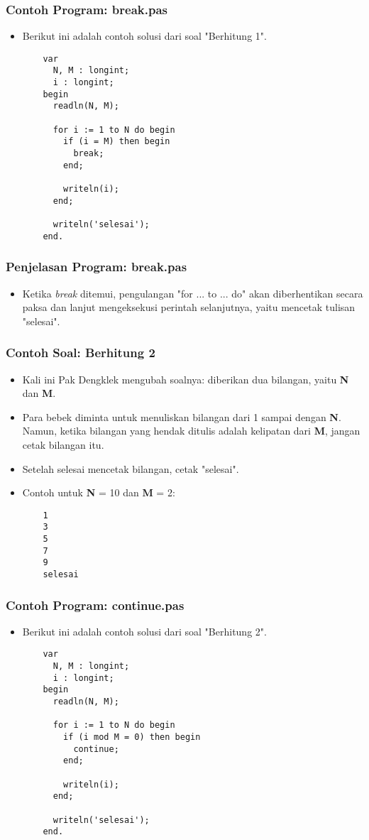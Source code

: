 \begin{frame}[fragile]
\frametitle{Contoh Program: break.pas}
\begin{itemize}
  \item Berikut ini adalah contoh solusi dari soal "Berhitung 1".
  \begin{lstlisting}
    var
      N, M : longint;
      i : longint;
    begin
      readln(N, M);

      for i := 1 to N do begin
        if (i = M) then begin
          break;
        end;

        writeln(i);
      end;

      writeln('selesai');
    end.
  \end{lstlisting}
\end{itemize}
\end{frame}

\begin{frame}
\frametitle{Penjelasan Program: break.pas}
\begin{itemize}
  \item Ketika \textit{break} ditemui, pengulangan "for ... to ... do" akan diberhentikan secara paksa dan lanjut mengeksekusi perintah selanjutnya, yaitu mencetak tulisan "selesai".
\end{itemize}
\end{frame}

\begin{frame}[fragile]
\frametitle{Contoh Soal: Berhitung 2}
\begin{itemize}
  \item Kali ini Pak Dengklek mengubah soalnya: diberikan dua bilangan, yaitu \textbf{N} dan \textbf{M}.
  \item Para bebek diminta untuk menuliskan bilangan dari 1 sampai dengan \textbf{N}. Namun, ketika bilangan yang hendak ditulis adalah \alert{kelipatan} dari \textbf{M}, jangan cetak bilangan itu.
  \item Setelah selesai mencetak bilangan, cetak "selesai".
  \item Contoh untuk \textbf{N} = 10 dan \textbf{M} = 2:
  \begin{lstlisting}
    1
    3
    5
    7
    9
    selesai
  \end{lstlisting}
\end{itemize}
\end{frame}

\begin{frame}[fragile]
\frametitle{Contoh Program: continue.pas}
\begin{itemize}
  \item Berikut ini adalah contoh solusi dari soal "Berhitung 2".
  \begin{lstlisting}
    var
      N, M : longint;
      i : longint;
    begin
      readln(N, M);

      for i := 1 to N do begin
        if (i mod M = 0) then begin
          continue;
        end;

        writeln(i);
      end;

      writeln('selesai');
    end.
  \end{lstlisting}
\end{itemize}
\end{frame}

